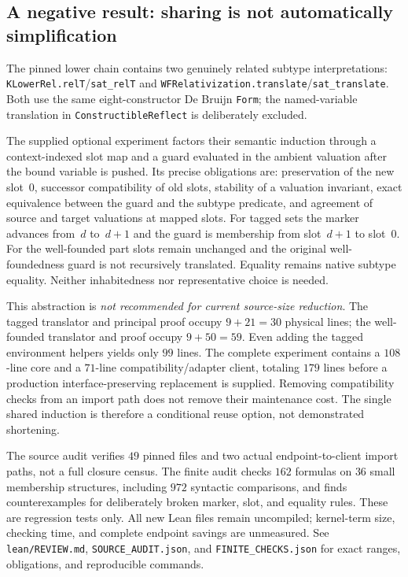 \subsection{A negative result: sharing is not automatically simplification}
The pinned lower chain contains two genuinely related subtype interpretations:
\texttt{KLowerRel.relT}/\texttt{sat\_relT} and
\texttt{WFRelativization.translate}/\texttt{sat\_translate}.
Both use the same eight-constructor De Bruijn \texttt{Form}; the named-variable
translation in \texttt{ConstructibleReflect} is deliberately excluded.

The supplied optional experiment factors their semantic induction through a
context-indexed slot map and a guard evaluated in the ambient valuation after
the bound variable is pushed. Its precise obligations are: preservation of the
new slot~0, successor compatibility of old slots, stability of a valuation
invariant, exact equivalence between the guard and the subtype predicate, and
agreement of source and target valuations at mapped slots. For tagged sets the
marker advances from~$d$ to~$d+1$ and the guard is membership from slot~$d+1$ to
slot~0. For the well-founded part slots remain unchanged and the original
well-foundedness guard is not recursively translated. Equality remains native
subtype equality. Neither inhabitedness nor representative choice is needed.

This abstraction is \emph{not recommended for current source-size reduction}.
The tagged translator and principal proof occupy $9+21=30$ physical lines;
the well-founded translator and proof occupy $9+50=59$. Even adding the tagged
environment helpers yields only $99$ lines. The complete experiment contains a
$108$-line core and a $71$-line compatibility/adapter client, totaling $179$
lines before a production interface-preserving replacement is supplied.
Removing compatibility checks from an import path does not remove their
maintenance cost. The single shared induction is therefore a conditional
reuse option, not demonstrated shortening.

The source audit verifies $49$ pinned files and two actual endpoint-to-client
import paths, not a full closure census. The finite audit checks $162$ formulas
on $36$ small membership structures, including $972$ syntactic comparisons,
and finds counterexamples for deliberately broken marker, slot, and equality
rules. These are regression tests only. All new Lean files remain uncompiled;
kernel-term size, checking time, and complete endpoint savings are unmeasured.
See \texttt{lean/REVIEW.md}, \texttt{SOURCE\_AUDIT.json}, and
\texttt{FINITE\_CHECKS.json} for exact ranges, obligations, and reproducible
commands.
